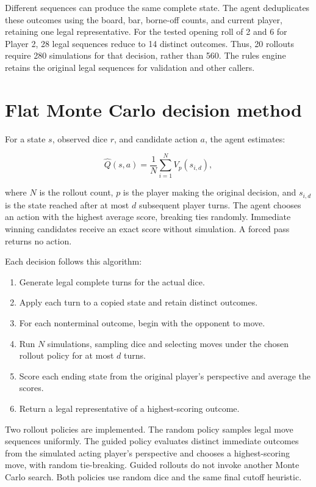 Different sequences can produce the same complete state. The agent deduplicates these outcomes using the board, bar, borne-off counts, and current player, retaining one legal representative. For the tested opening roll of 2 and 6 for Player 2, 28 legal sequences reduce to 14 distinct outcomes. Thus, 20 rollouts require 280 simulations for that decision, rather than 560. The rules engine retains the original legal sequences for validation and other callers.

\section{Flat Monte Carlo decision method}

For a state $s$, observed dice $r$, and candidate action $a$, the agent estimates:

\[
\widehat{Q}(s,a)=\frac{1}{N}\sum_{i=1}^{N}V_p(s_{i,d}),
\]

where $N$ is the rollout count, $p$ is the player making the original decision, and $s_{i,d}$ is the state reached after at most $d$ subsequent player turns. The agent chooses an action with the highest average score, breaking ties randomly. Immediate winning candidates receive an exact score without simulation. A forced pass returns no action.

Each decision follows this algorithm:

\begin{enumerate}
\item Generate legal complete turns for the actual dice.
\item Apply each turn to a copied state and retain distinct outcomes.
\item For each nonterminal outcome, begin with the opponent to move.
\item Run $N$ simulations, sampling dice and selecting moves under the chosen rollout policy for at most $d$ turns.
\item Score each ending state from the original player's perspective and average the scores.
\item Return a legal representative of a highest-scoring outcome.
\end{enumerate}

Two rollout policies are implemented. The random policy samples legal move sequences uniformly. The guided policy evaluates distinct immediate outcomes from the simulated acting player's perspective and chooses a highest-scoring move, with random tie-breaking. Guided rollouts do not invoke another Monte Carlo search. Both policies use random dice and the same final cutoff heuristic.

